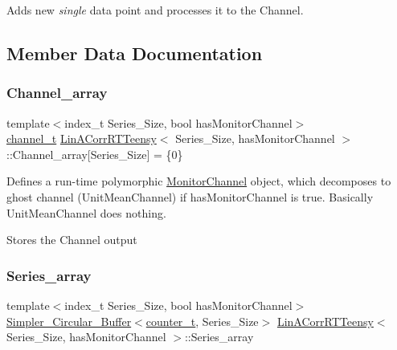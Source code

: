 Adds new {\itshape single} data point and processes it to the {\ttfamily Channel}. 



\subsection{Member Data Documentation}
\mbox{\label{classLinACorrRTTeensy_a3276cb9bb215af9676edc35958c889b8}} 
\subsubsection{\texorpdfstring{Channel\+\_\+array}{Channel\_array}}
{\footnotesize\ttfamily template$<$index\+\_\+t Series\+\_\+\+Size, bool has\+Monitor\+Channel$>$ \\
\hyperlink{types_8hpp_a9f8f935e7952f42d763385090e3404a5}{channel\+\_\+t} \hyperlink{classLinACorrRTTeensy}{Lin\+A\+Corr\+R\+T\+Teensy}$<$ Series\+\_\+\+Size, has\+Monitor\+Channel $>$\+::Channel\+\_\+array\mbox{[}Series\+\_\+\+Size\mbox{]} = \{0\}}



Defines a run-\/time polymorphic \hyperlink{classMonitorChannel}{Monitor\+Channel} object, which decomposes to {\ttfamily ghost} channel (Unit\+Mean\+Channel) if {\ttfamily has\+Monitor\+Channel} is true. Basically {\ttfamily Unit\+Mean\+Channel} does nothing. 

Stores the Channel output \mbox{\label{classLinACorrRTTeensy_a5c4cc1fe032812d6290579c7c8b22e57}} 
\subsubsection{\texorpdfstring{Series\+\_\+array}{Series\_array}}
{\footnotesize\ttfamily template$<$index\+\_\+t Series\+\_\+\+Size, bool has\+Monitor\+Channel$>$ \\
\hyperlink{classSimpler__Circular__Buffer}{Simpler\+\_\+\+Circular\+\_\+\+Buffer}$<$\hyperlink{types_8hpp_a22f279793847eba127de149437848c48}{counter\+\_\+t}, Series\+\_\+\+Size$>$ \hyperlink{classLinACorrRTTeensy}{Lin\+A\+Corr\+R\+T\+Teensy}$<$ Series\+\_\+\+Size, has\+Monitor\+Channel $>$\+::Series\+\_\+array}



